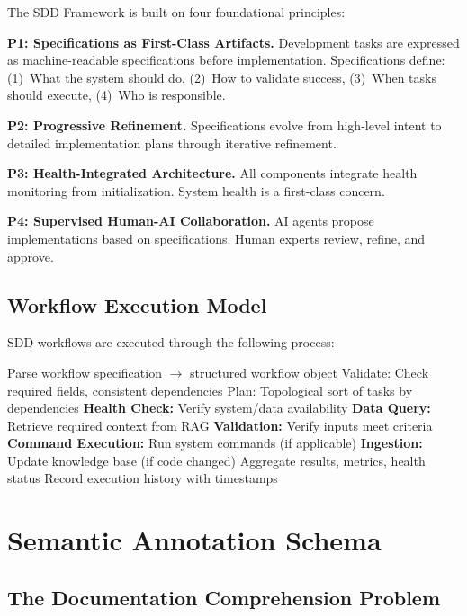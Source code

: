 \documentclass[11pt,letterpaper]{article}
\begin{document}
The SDD Framework is built on four foundational principles:

\textbf{P1: Specifications as First-Class Artifacts.} Development tasks are expressed as machine-readable specifications before implementation. Specifications define: (1)~What the system should do, (2)~How to validate success, (3)~When tasks should execute, (4)~Who is responsible.

\textbf{P2: Progressive Refinement.} Specifications evolve from high-level intent to detailed implementation plans through iterative refinement.

\textbf{P3: Health-Integrated Architecture.} All components integrate health monitoring from initialization. System health is a first-class concern.

\textbf{P4: Supervised Human-AI Collaboration.} AI agents propose implementations based on specifications. Human experts review, refine, and approve.

\subsection{Workflow Execution Model}

SDD workflows are executed through the following process:

\begin{algorithm}
\caption{SDD Workflow Execution}
\begin{algorithmic}[1]
\STATE Parse workflow specification $\rightarrow$ structured workflow object
\STATE Validate: Check required fields, consistent dependencies
\STATE Plan: Topological sort of tasks by dependencies
    \STATE \textbf{Health Check:} Verify system/data availability
    \STATE \textbf{Data Query:} Retrieve required context from RAG
    \STATE \textbf{Validation:} Verify inputs meet criteria
    \STATE \textbf{Command Execution:} Run system commands (if applicable)
    \STATE \textbf{Ingestion:} Update knowledge base (if code changed)
\ENDFOR
\STATE Aggregate results, metrics, health status
\STATE Record execution history with timestamps
\end{algorithmic}
\end{algorithm}

\section{Semantic Annotation Schema}
\label{sec:annotations}

\subsection{The Documentation Comprehension Problem}
\end{document}
